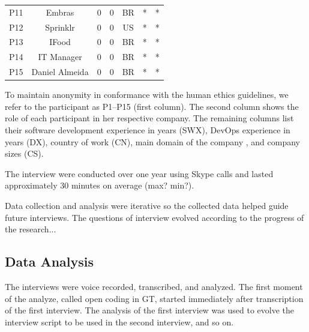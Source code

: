 \begin{table}[t]
\begin{tabular}{ccccccc}
P11                  & Embras                & 0            & 0           & BR            & *                  & *                               \\

P12                  & Sprinklr              & 0            & 0           & US            & *                  & *                               \\

P13                  & IFood                 & 0            & 0           & BR            & *                  & *                               \\

P14                  & IT Manager            & 0            & 0           & BR            & *                  & *                               \\

P15                  & Daniel Almeida        & 0            & 0           & BR            & *                  & *
\end{tabular}
\end{table}

To maintain anonymity in conformance with the human ethics guidelines,
we refer to the participant as P1--P15 (first column).
The second column shows the role of
each participant in her respective company. The remaining columns list their
software development experience in years (SWX), DevOps experience in years (DX),
country of work (CN), main domain of the company , and company
sizes (CS).

The interview were conducted over one year using Skype calls and lasted
approximately 30 minutes on average (max? min?).

Data collection and analysis were iterative so the collected data helped guide
future interviews. The questions of interview evolved according to the progress
of the research...

\subsection{Data Analysis}
The interviews were voice recorded, transcribed, and analyzed. The first moment
of the analyze, called open coding in GT, started immediately after
transcription of the first interview. The analysis of the
first interview was used to evolve the interview script to be used in
the second interview, and so on.

